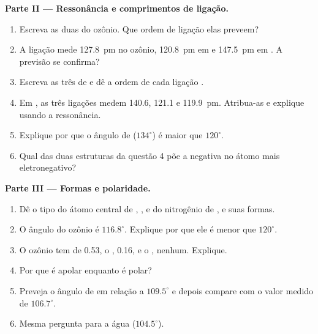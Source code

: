 \begin{problem}
\medskip
\noindent\textbf{Parte II --- Ressonância e comprimentos de ligação.}
\begin{enumerate}[resume]
  \item Escreva as duas  do ozônio. Que ordem de
        ligação elas preveem?
  \item A ligação  mede \qty{127.8}{pm} no ozônio,
        \qty{120.8}{pm} em  e \qty{147.5}{pm} em . A
        previsão se confirma?
  \item Escreva as três  de  e dê a
        ordem de cada ligação .
  \item Em , as três ligações  medem 140.6, 121.1 e
        \qty{119.9}{pm}. Atribua-as e explique usando a ressonância.
  \item Explique por que o ângulo  de  ($134^\circ$) é
        maior que $120^\circ$.
  \item Qual das duas estruturas da questão 4 põe a  negativa
        no átomo mais eletronegativo?
\end{enumerate}

\medskip
\noindent\textbf{Parte III --- Formas e polaridade.}
\begin{enumerate}[resume]
  \item Dê o tipo  do átomo central de ,
        ,  e do nitrogênio de , e suas formas.
  \item O ângulo do ozônio é $116.8^\circ$. Explique por que ele é menor
        que $120^\circ$.
  \item O ozônio tem  de \qty{0.53}{\debye}, o ,
        \qty{0.16}{\debye}, e o , nenhum. Explique.
  \item Por que  é apolar enquanto  é polar?
  \item Preveja o ângulo de  em relação a $109.5^\circ$ e depois
        compare com o valor medido de $106.7^\circ$.
  \item Mesma pergunta para a água ($104.5^\circ$).
\end{enumerate}


\end{problem}
